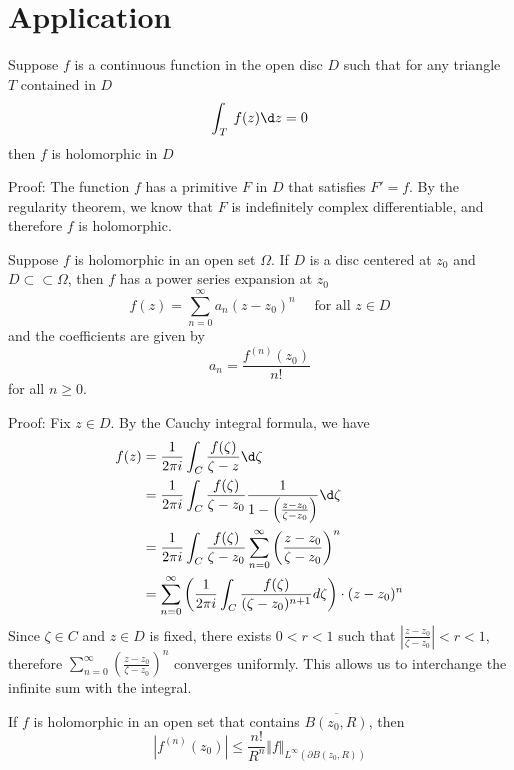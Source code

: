 \documentclass[12pt, oneside]{book}
\begin{document}
\section{Application}
\begin{theorem}[Morera]
    Suppose $f$ is a continuous function in the open disc $D$ such that for any triangle $T$ contained in $D$
    $$\int_T\:f(z)\d z=0$$
    then $f$ is holomorphic in $D$

    Proof: The function $f$ has a primitive $F$ in $D$ that satisfies $F'=f$. By the regularity theorem, we know that $F$ is indefinitely complex differentiable, and therefore $f$ is holomorphic.
\end{theorem}
\begin{theorem}
    Suppose $f$ is holomorphic in an open set $\Omega$. If $D$ is a disc centered at $z_0$ and $D \subset \subset \Omega$, then $f$ has a power series expansion at $z_0$
    $$f(z)=\sum_{n=0}^\infty a_n(z-z_0)^n\quad \text{ for all }z\in D$$
    and the coefficients are given by
    $$a_n=\frac{f^{(n)}(z_0)}{n!}$$
    for all $n\geq 0$.

    Proof:
    Fix $z\in D$. By the Cauchy integral formula, we have
    $$\begin{aligned}
            f(z) & =\frac{1}{2\pi i}\int_C\frac{f(\zeta)}{\zeta-z}\d \zeta                                                     \\
                 & =\frac{1}{2\pi i}\int_C\frac{f(\zeta)}{\zeta-z_0}\frac{1}{1-\left(\frac{z-z_0}{\zeta-z_0}\right)}\d \zeta   \\
                 & =\frac{1}{2\pi i}\int_C\frac{f(\zeta)}{\zeta-z_0}\sum_{n=0}^\infty\left(\frac{z-z_0}{\zeta-z_0}\right)^n    \\
                 & =\sum_{n=0}^\infty\left(\frac{1}{2\pi i}\int_C\frac{f(\zeta)}{(\zeta-z_0)^{n+1}}d\zeta\right)\cdot(z-z_0)^n
        \end{aligned}$$
    Since $\zeta\in C$ and $z\in D$ is fixed, there exists $0 <r< 1$ such that $\left|\frac{z-z_0}{\zeta-z_0}\right|<r<1$, therefore $\sum_{n=0}^\infty\left(\frac{z-z_0}{\zeta-z_0}\right)^n$ converges uniformly. This allows us to interchange the infinite sum with the integral.
\end{theorem}
\begin{corollary}
    If $f$ is holomorphic in an open set that contains $\overline{B(z_0,R)}$, then
    $$\left|f^{(n)}(z_0)\right| \leq \frac{n!}{R^n}\Vert f\Vert_{L^{\infty}(\partial B(z_0,R))}$$
\end{corollary}
\end{document}
